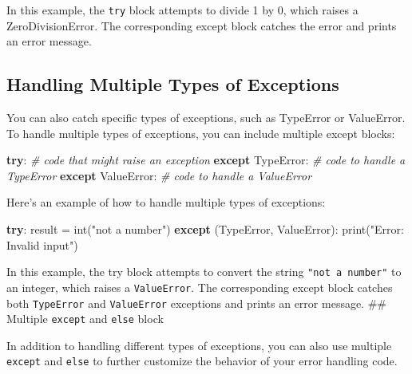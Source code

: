 \documentclass[11pt]{article}
\newenvironment{Shaded}{}{}
\newcommand{\StringTok}[1]{\textcolor[rgb]{0.25,0.44,0.63}{{#1}}}
\newcommand{\CommentTok}[1]{\textcolor[rgb]{0.38,0.63,0.69}{\textit{{#1}}}}
\newcommand{\NormalTok}[1]{{#1}}
\newcommand{\ControlFlowTok}[1]{\textcolor[rgb]{0.00,0.44,0.13}{\textbf{{#1}}}}
\newcommand{\OperatorTok}[1]{\textcolor[rgb]{0.40,0.40,0.40}{{#1}}}
\newcommand{\BuiltInTok}[1]{{#1}}
\newcommand{\PreprocessorTok}[1]{\textcolor[rgb]{0.74,0.48,0.00}{{#1}}}
\begin{document}
In this example, the \texttt{try} block attempts to divide 1 by 0, which
raises a ZeroDivisionError. The corresponding except block catches the
error and prints an error message.

\hypertarget{handling-multiple-types-of-exceptions}{%
\subsection{Handling Multiple Types of
Exceptions}\label{handling-multiple-types-of-exceptions}}

You can also catch specific types of exceptions, such as TypeError or
ValueError. To handle multiple types of exceptions, you can include
multiple except blocks:

\begin{Shaded}
\begin{Highlighting}[]
\ControlFlowTok{try}\NormalTok{:}
    \CommentTok{\# code that might raise an exception}
\ControlFlowTok{except} \PreprocessorTok{TypeError}\NormalTok{:}
    \CommentTok{\# code to handle a TypeError}
\ControlFlowTok{except} \PreprocessorTok{ValueError}\NormalTok{:}
    \CommentTok{\# code to handle a ValueError}
\end{Highlighting}
\end{Shaded}

Here's an example of how to handle multiple types of exceptions:

\begin{Shaded}
\begin{Highlighting}[]
\ControlFlowTok{try}\NormalTok{:}
\NormalTok{    result }\OperatorTok{=} \BuiltInTok{int}\NormalTok{(}\StringTok{"not a number"}\NormalTok{)}
\ControlFlowTok{except}\NormalTok{ (}\PreprocessorTok{TypeError}\NormalTok{, }\PreprocessorTok{ValueError}\NormalTok{):}
    \BuiltInTok{print}\NormalTok{(}\StringTok{"Error: Invalid input"}\NormalTok{)}
\end{Highlighting}
\end{Shaded}

In this example, the try block attempts to convert the string
\texttt{"not\ a\ number"} to an integer, which raises a
\texttt{ValueError}. The corresponding except block catches both
\texttt{TypeError} and \texttt{ValueError} exceptions and prints an
error message. \#\# Multiple \texttt{except} and \texttt{else} block

In addition to handling different types of exceptions, you can also use
multiple \texttt{except} and \texttt{else} to further customize the
behavior of your error handling code.
\end{document}
